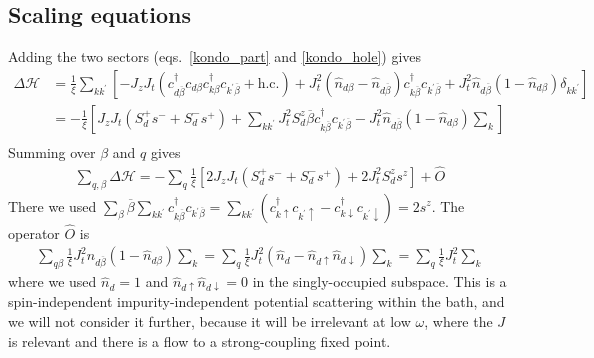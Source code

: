 \documentclass[twoside]{report}
\numberwithin{equation}{section}
\begin{document}
\subsection{Scaling equations}
Adding the two sectors (eqs.~\ref{kondo_part} and \ref{kondo_hole}) gives
\begin{equation}\begin{aligned}
	\Delta \mathcal{H} &= \frac{1}{\xi}\sum_{kk^\prime} \left[ - J_z J_t\left(c^\dagger_{d\overline\beta}c_{d\beta}c^\dagger_{k\beta}c_{k^\prime\overline\beta} + \text{h.c.}\right) + J_t^2 \left(\hat n_{d\beta} - \hat n_{d\overline\beta}\right) c^\dagger_{k\overline\beta}c_{k^\prime\overline\beta} + J_t^2 \hat n_{d\overline\beta}\left(1 - \hat n_{d\beta}\right) \delta_{kk^\prime}\right]\\
		    &= -\frac{1}{\xi}\left[ J_z J_t\left(S_d^+ s^- + S_d^- s^+\right) + \sum_{kk^\prime} J_t^2 S_d^z \overline\beta c^\dagger_{k\overline\beta}c_{k^\prime\overline\beta} - J_t^2 \hat n_{d\overline\beta}\left(1 - \hat n_{d\beta}\right) \sum_{k} \right]\\
\end{aligned}\end{equation}
Summing over \(\beta\) and \(q\) gives
\begin{equation}\begin{aligned}
	\sum_{q,\beta} \Delta \mathcal{H} = - \sum_q \frac{1}{\xi} \left[2J_z J_t \left( S_d^+ s^- + S_d^- s^+ \right) + 2J_t^2 S_d^z s^z\right] + \hat O
\end{aligned}\end{equation}
There we used \(\sum_\beta \overline\beta \sum_{kk^\prime}c^\dagger_{k\overline\beta}c_{k^\prime\overline\beta} = \sum_{kk^\prime}\left(c^\dagger_{k\uparrow}c_{k^\prime\uparrow} - c^\dagger_{k\downarrow}c_{k^\prime\downarrow}\right)  = 2s^z\). The operator \(\hat O\) is
\begin{equation}\begin{aligned}
	\sum_{q\beta} \frac{1}{\xi} J_t^2 \hat n_{d\overline\beta}\left(1 - \hat n_{d\beta}\right) \sum_{k} = \sum_q \frac{1}{\xi} J_t^2 \left(\hat n_d - \hat n_{d \uparrow} \hat n_{d \downarrow}\right) \sum_k = \sum_q\frac{1}{\xi} J_t^2 \sum_k
\end{aligned}\end{equation}
where we used \(\hat n_d = 1\) and \(\hat n_{d \uparrow} \hat n_{d \downarrow} = 0\) in the singly-occupied subspace. This is a spin-independent impurity-independent potential scattering  within the bath, and we will not consider it further, because it will be irrelevant at low \(\omega\), where the \(J\) is relevant and there is a flow to a strong-coupling fixed point.
\end{document}
